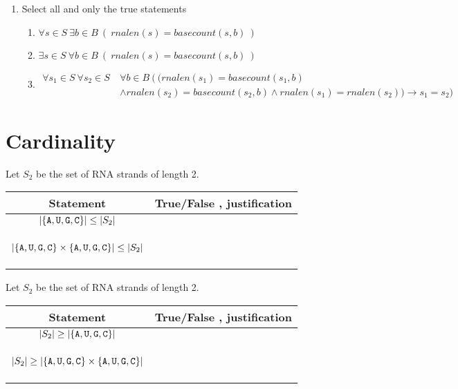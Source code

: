 \documentclass[12pt, oneside]{article}
\begin{document}
\begin{enumerate}
\begin{enumerate}
\item Select all and only the true statements
\begin{enumerate}
\item $\forall s \in S ~\exists b \in B ~\left(~rnalen(s) = basecount(s,b)~ \right)$
\item $\exists s \in S ~\forall b \in B ~\left(~rnalen(s) = basecount(s,b)~ \right)$
\item \begin{align*} \forall s_1 \in S~\forall s_2 \in S ~&\forall b \in B ~\big( ~\big( rnalen(s_1) = basecount(s_1,b) \\
&\land rnalen(s_2) = basecount(s_2,b) \land rnalen(s_1) = rnalen(s_2) \big) \to s_1 = s_2  \big)\end{align*}
\end{enumerate}

\end{enumerate}
\end{enumerate}
\newpage

\section*{Cardinality}

Let $S_2$ be the set of RNA strands of length 2.

\vspace{-20pt}

\begin{center}
\begin{tabular}{|c|p{5in}|}
\hline
Statement  &  True/False , justification \\
\hline
$| \{\texttt{A},\texttt{U},\texttt{G},\texttt{C}\} | \leq |S_2 |$ &  \\
&\\&\\&\\
\hline
$| \{\texttt{A},\texttt{U},\texttt{G},\texttt{C}\} \times \{\texttt{A}, \texttt{U}, \texttt{G},\texttt{C}\} | \leq |S_2 |$ &  \\
&\\&\\&\\
\hline
\end{tabular}
\end{center}

\vfill

Let $S_2$ be the set of RNA strands of length 2.

\vspace{-20pt}

\begin{center}
\begin{tabular}{|c|p{5in}|}
\hline
Statement  &  True/False , justification \\
\hline
$ |S_2 | \geq | \{\texttt{A},\texttt{U},\texttt{G},\texttt{C}\} |$ &  \\
&\\&\\&\\
\hline
$ |S_2 | \geq | \{\texttt{A},\texttt{U},\texttt{G},\texttt{C}\} \times \{\texttt{A}, \texttt{U}, \texttt{G},\texttt{C}\} |$ &  \\
&\\&\\&\\
\hline
\end{tabular}
\end{center}
\end{document}
